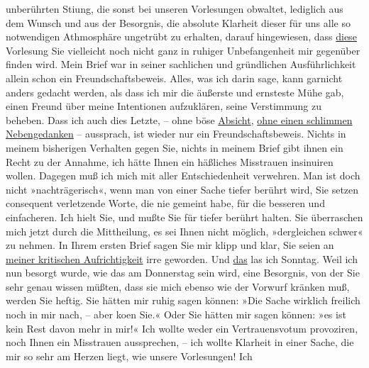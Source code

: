 \begin{ledgroupsized}[t]{13cm}
               unberührten Sti{\geminationm}ung, die sonst bei unseren Vorlesungen
               obwaltet, lediglich aus dem Wunsch und aus der Besorgnis, die absolute Klarheit
               dieser für uns alle so notwendigen Athmosphäre ungetrübt zu erhalten, darauf
               hingewiesen, dass \uline{diese} Vorlesung Sie vielleicht noch
               nicht ganz in ruhiger Unbefangenheit mir gegenüber finden wird. \pend
           \pstart
           Mein Brief war in seiner sachlichen und gründlichen Ausführlichkeit allein schon ein
               Freundschaftsbeweis. Alles, was ich darin sage, kann garnicht anders gedacht werden,
               als dass ich mir die äußerste und ernsteste Mühe gab, einen Freund über meine {\pb}Intentionen aufzuklären, seine
               Verstimmung zu beheben. Dass ich auch dies Letzte, – ohne böse \uline{Absicht}, \uline{ohne einen schlimmen
                  Nebengedanken} – aussprach, ist wieder nur ein Freundschaftsbeweis. Nichts in
               meinem bisherigen Verhalten gegen Sie, nichts in meinem Brief gibt ihnen ein Recht zu
               der Annahme, ich hätte Ihnen ein häßliches Misstrauen insinuiren wollen. Dagegen muß
               ich mich mit aller Entschiedenheit verwehren. \pend
           \pstart
           Man ist doch nicht »nachträgerisch«, wenn man von einer Sache tiefer berührt wird,
               Sie setzen consequent verletzende Worte, die  nie
               gemeint habe, für die besseren und einfacheren. \pend
           \pstart
           Ich hielt Sie, und mußte Sie für tiefer berührt halten. Sie überraschen mich jetzt
               durch die Mittheilung, es sei Ihnen nicht möglich, »dergleichen schwer« zu nehmen. \pend
           \pstart
           In Ihrem ersten Brief sagen Sie mir klipp und klar, Sie seien an \uline{meiner kritischen Aufrichtigkeit} irre geworden. Und \uline{das} las ich Sonntag. Weil ich nun besorgt
               wurde, wie das am Donnerstag sein wird, eine Besorgnis, von der Sie sehr
               genau wissen müßten, dass sie mich ebenso wie der Vorwurf kränken muß, werden Sie
               heftig. \pend
           \pstart
           Sie hätten mir ruhig sagen können: »Die Sache wirklich freilich noch in mir nach, –
               aber ko{\geminationm}en {\pb}Sie.« Oder Sie
               hätten mir sagen können: »es ist kein Rest davon mehr in mir!« Ich wollte weder ein
               Vertrauensvotum provoziren, noch Ihnen ein Misstrauen aussprechen, – ich wollte
               Klarheit in einer Sache, die mir so sehr am Herzen liegt, wie unsere Vorlesungen! Ich

\end{ledgroupsized}

